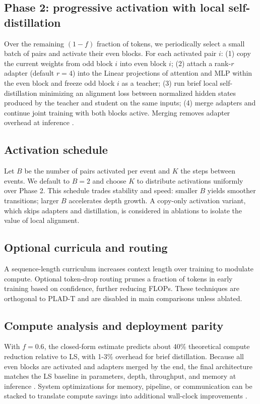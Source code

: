 \documentclass{article}
\begin{document}
\subsection{Phase 2: progressive activation with local self-distillation}
Over the remaining \((1-f)\) fraction of tokens, we periodically select a small batch of pairs and activate their even blocks. For each activated pair \(i\): (1) copy the current weights from odd block \(i\) into even block \(i\); (2) attach a rank-\(r\) adapter (default \(r=4\)) into the Linear projections of attention and MLP within the even block and freeze odd block \(i\) as a teacher; (3) run brief local self-distillation minimizing an alignment loss between normalized hidden states produced by the teacher and student on the same inputs; (4) merge adapters and continue joint training with both blocks active. Merging removes adapter overhead at inference \cite{miles-2024-velora}.

\subsection{Activation schedule}
Let \(B\) be the number of pairs activated per event and \(K\) the steps between events. We default to \(B=2\) and choose \(K\) to distribute activations uniformly over Phase 2. This schedule trades stability and speed: smaller \(B\) yields smoother transitions; larger \(B\) accelerates depth growth. A copy-only activation variant, which skips adapters and distillation, is considered in ablations to isolate the value of local alignment.

\subsection{Optional curricula and routing}
A sequence-length curriculum increases context length over training to modulate compute. Optional token-drop routing prunes a fraction of tokens in early training based on confidence, further reducing FLOPs. These techniques are orthogonal to PLAD-T and are disabled in main comparisons unless ablated.

\subsection{Compute analysis and deployment parity}
With \(f = 0.6\), the closed-form estimate predicts about 40\% theoretical compute reduction relative to LS, with 1-3\% overhead for brief distillation. Because all even blocks are activated and adapters merged by the end, the final architecture matches the LS baseline in parameters, depth, throughput, and memory at inference \cite{liu-2024-mobilellm}. System optimizations for memory, pipeline, or communication can be stacked to translate compute savings into additional wall-clock improvements \cite{andoorveedu-2022-tempo,narayanan-2020-memory,jia-2024-toward}.
\end{document}
